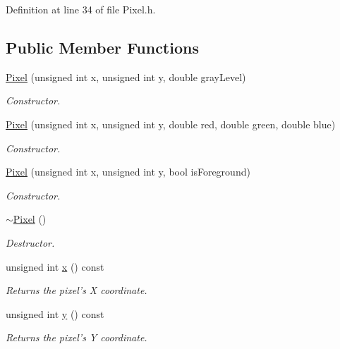 Definition at line 34 of file Pixel.h.\subsection*{Public Member Functions}
\begin{CompactItemize}
\item 
\hyperlink{class_pixel_dfa33daefa83d3ac471af91fb32f8997}{Pixel} (unsigned int x, unsigned int y, double grayLevel)
\begin{CompactList}\small\item\em Constructor. \item\end{CompactList}\item 
\hyperlink{class_pixel_e5ca1376e87442aea5968a17a4240814}{Pixel} (unsigned int x, unsigned int y, double red, double green, double blue)
\begin{CompactList}\small\item\em Constructor. \item\end{CompactList}\item 
\hyperlink{class_pixel_3138f81f8e7ea10f6764f47136129ad0}{Pixel} (unsigned int x, unsigned int y, bool isForeground)
\begin{CompactList}\small\item\em Constructor. \item\end{CompactList}\item 
\hyperlink{class_pixel_30f6aaf9a1d8792245070860546fa365}{$\sim$Pixel} ()
\begin{CompactList}\small\item\em Destructor. \item\end{CompactList}\item 
unsigned int \hyperlink{class_pixel_68dafccc4588fb33d445641c2766316b}{x} () const 
\begin{CompactList}\small\item\em Returns the pixel's X coordinate. \item\end{CompactList}\item 
unsigned int \hyperlink{class_pixel_204cc91a99e1e4f1d96c9cf6caf5747a}{y} () const 
\begin{CompactList}\small\item\em Returns the pixel's Y coordinate. \item\end{CompactList}\item 

\end{CompactItemize}
